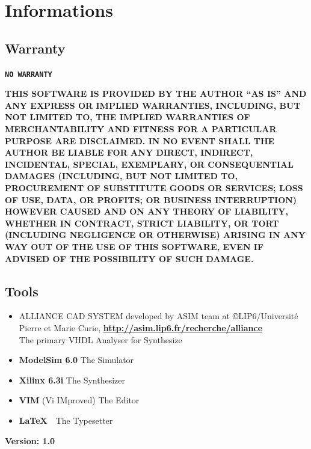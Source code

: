 \documentclass[a4paper,12pt]{report}
\begin{document}
\appendix

\chapter{Informations}

\section{Warranty}

\begin{center}
\textbf{\texttt{NO WARRANTY}}\\
\end{center}

\textbf{\scriptsize{
THIS SOFTWARE IS PROVIDED BY THE AUTHOR ``AS IS'' AND ANY EXPRESS OR
IMPLIED WARRANTIES, INCLUDING, BUT NOT LIMITED TO, THE IMPLIED WARRANTIES
OF MERCHANTABILITY AND FITNESS FOR A PARTICULAR PURPOSE ARE DISCLAIMED.
IN NO EVENT SHALL THE AUTHOR BE LIABLE FOR ANY DIRECT, INDIRECT,
INCIDENTAL, SPECIAL, EXEMPLARY, OR CONSEQUENTIAL DAMAGES (INCLUDING, BUT
NOT LIMITED TO, PROCUREMENT OF SUBSTITUTE GOODS OR SERVICES; LOSS OF USE,
DATA, OR PROFITS; OR BUSINESS INTERRUPTION) HOWEVER CAUSED AND ON ANY
THEORY OF LIABILITY, WHETHER IN CONTRACT, STRICT LIABILITY, OR TORT
(INCLUDING NEGLIGENCE OR OTHERWISE) ARISING IN ANY WAY OUT OF THE USE OF
THIS SOFTWARE, EVEN IF ADVISED OF THE POSSIBILITY OF SUCH DAMAGE.}}

\section{Tools}

\begin{itemize}
\item ALLIANCE CAD SYSTEM developed by ASIM
      team at \copyright LIP6/Universit\'{e} Pierre et
      Marie Curie,
      \href{http://asim.lip6.fr/recherche/alliance}{\textbf{http://asim.lip6.fr/recherche/alliance}}\\
      The primary VHDL Analyser for Synthesize
\item \textbf{ModelSim 6.0} The Simulator
\item \textbf{Xilinx 6.3i} The Synthesizer
\item \textbf{VIM} (Vi IMproved) The Editor
\item \textbf{\LaTeX}~~The Typesetter
\end{itemize}

\vspace{15cm}
\begin{tabbing}
\textbf{Version: 1.0} 
\end{tabbing}
\end{document}
